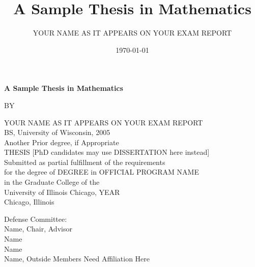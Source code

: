 \documentclass[12pt,reqno,oneside]{amsbook}
\theoremstyle{definition}
\begin{document}
\newcommand{\thetitle}{A Sample Thesis in Mathematics}

\newcommand{\institution}{University of Illinois Chicago} 
\newcommand{\degree}{DEGREE}
\newcommand{\programname}{OFFICIAL PROGRAM NAME}
\newcommand{\committee}{Name, Chair, Advisor \\ Name \\ Name\\ Name, Outside Members Need Affiliation Here}
\newcommand{\theauthor}{YOUR NAME AS IT APPEARS ON YOUR EXAM REPORT}
\newcommand{\priordegrees}{BS, University of Wisconsin, 2005\\ Another Prior degree, if Appropriate}
\newcommand{\graduationyear}{YEAR}

\author{\theauthor}
\title{\thetitle}
\date{\today}

\frontmatter

\begin{titlepage}
    \centering
	{{\Large {\textbf{\thetitle}}}  \par}
    \vspace{2cm}
    {BY\par}
    \vspace{0.5cm}
    {\theauthor}\\
    {\priordegrees}\\
    \vspace{2cm}
	THESIS [PhD candidates may use DISSERTATION here instead]\\
	\vspace{1cm}
	Submitted as partial fulfillment of the requirements\\ \vspace{0.2cm}
	for the degree of {\degree} in {\programname} \\ \vspace{0.2cm}
	in the Graduate College of the \\  \vspace{0.2cm}
	University of Illinois Chicago, {\graduationyear}\\
	\vspace{1cm}
	Chicago, Illinois
		
	\raggedright
    \vfill
    Defense Committee: \\
    \committee \\
\end{titlepage}
\end{document}
